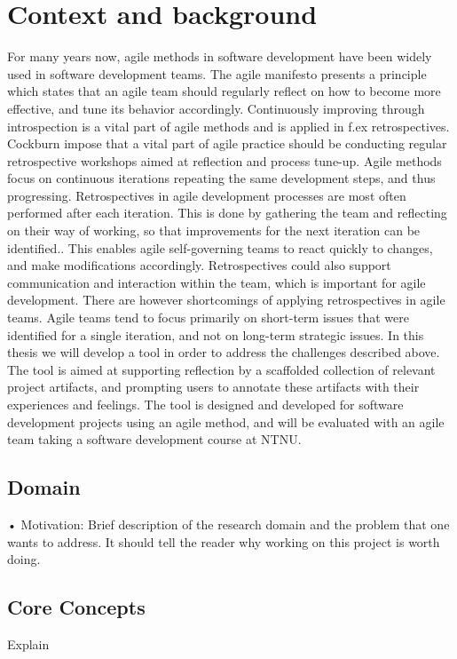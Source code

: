 \section{Context and background}
For many years now, agile methods in software development have been widely used in software development teams. The agile manifesto presents a principle which states that an agile team should regularly reflect on how to become more effective, and tune its behavior accordingly\cite{Beck2001}. Continuously improving through introspection is a vital part of agile methods and is applied in f.ex retrospectives\cite{Beck1999, Derby2006, Maham2008}. Cockburn impose that a vital part of agile practice should be conducting regular retrospective workshops aimed at reflection and process tune-up\cite{Cockburn2006}. Agile methods focus on continuous iterations repeating the same development steps, and thus progressing. Retrospectives in agile development processes are most often performed after each iteration. This is done by gathering the team and reflecting on their way of working, so that improvements for the next iteration can be identified.\cite{Derby2006, Drury2011}. This enables agile self-governing teams to react quickly to changes, and make modifications accordingly\cite{Drury2011}. Retrospectives could also support communication and interaction within the team, which is important for agile development. There are however shortcomings of applying retrospectives in agile teams. Agile teams tend to focus primarily on short-term issues that were identified for a single iteration, and not on long-term strategic issues\cite{Drury2011}. 
In this thesis we will develop a tool in order to address the challenges described above. The tool is aimed at supporting reflection by a scaffolded collection of relevant project artifacts, and prompting users to annotate these artifacts with their experiences and feelings. The tool is designed and developed for software development projects using an agile method, and will be evaluated with an agile team taking a software development course at NTNU. 

\subsection{Domain}
• Motivation: Brief description of the research domain and the problem that one
wants to address. It should tell the reader why working on this project is worth
doing.

\subsection{Core Concepts}
Explain

